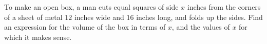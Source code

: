 To make an open box, a man cuts equal squares of side $x$ inches from the corners of a sheet of metal $12$ inches wide and $16$ inches long, and folds up the sides. Find an expression for the volume of the box in terms of $x$, and the values of $x$ for which it makes sense.

